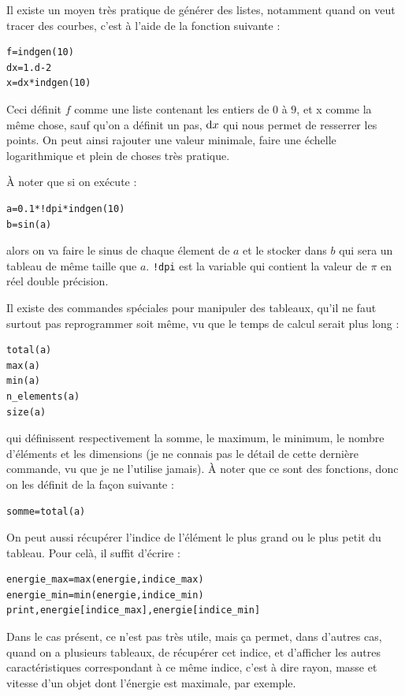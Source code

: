 \documentclass[a4paper,twoside]{article}
\begin{document}
Il existe un moyen très pratique de générer des listes, notamment quand on veut tracer des courbes, c'est à l'aide de la fonction suivante :
\begin{verbatim}
f=indgen(10)
dx=1.d-2
x=dx*indgen(10)
\end{verbatim}

Ceci définit $f$ comme une liste contenant les entiers de $0$ à $9$, et x comme la même chose, sauf qu'on a définit un pas, $\operatorname{d \!} x$ qui nous permet de resserrer les points. On peut ainsi rajouter une valeur minimale, faire une échelle logarithmique et plein de choses très pratique.

\begin{remarque}
À noter que si on exécute :
\begin{verbatim}
a=0.1*!dpi*indgen(10)
b=sin(a)
\end{verbatim}
alors on va faire le sinus de chaque élement de $a$ et le stocker dans $b$ qui sera un tableau de même taille que $a$. \verb|!dpi| est la variable qui contient la valeur de $\pi$ en réel double précision.
\end{remarque}


\bigskip

Il existe des commandes spéciales pour manipuler des tableaux, qu'il ne faut surtout pas reprogrammer soit même, vu que le temps de calcul serait plus long :
\begin{verbatim}
total(a)
max(a)
min(a)
n_elements(a)
size(a)
\end{verbatim}
qui définissent respectivement la somme, le maximum, le minimum, le nombre d'éléments et les dimensions (je ne connais pas le détail de cette dernière commande, vu que je ne l'utilise jamais). À noter que ce sont des fonctions, donc on les définit de la façon suivante :
\begin{verbatim}
somme=total(a)
\end{verbatim}

\begin{remarque}
On peut aussi récupérer l'indice de l'élément le plus grand ou le plus petit du tableau. Pour celà, il suffit d'écrire :
\begin{verbatim}
energie_max=max(energie,indice_max)
energie_min=min(energie,indice_min)
print,energie[indice_max],energie[indice_min]
\end{verbatim}

Dans le cas présent, ce n'est pas très utile, mais ça permet, dans d'autres cas, quand on a plusieurs tableaux, de récupérer cet indice, et d'afficher les autres caractéristiques correspondant à ce même indice, c'est à dire rayon, masse et vitesse d'un objet dont l'énergie est maximale, par exemple.
\end{remarque}
\end{document}
